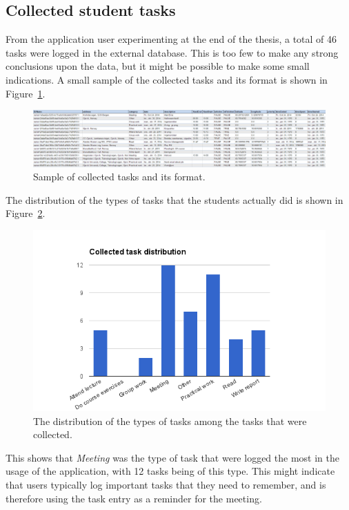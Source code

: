 \subsection{Collected student tasks}
\label{subsec:collectedtasks}

From the application user experimenting at the end of the thesis, a total of 46 tasks were logged in the external database. This is too few to make any strong conclusions upon the data, but it might be possible to make some small indications. A small sample of the collected tasks and its format is shown in Figure~\ref{fig:collectedtaskssample}.
\begin{figure}[tbp]
\centering
\includegraphics[width=\columnwidth]{figures/CollectedTasksFormat.PNG}
\caption[Collected tasks sample]{Sample of collected tasks and its format.}
\label{fig:collectedtaskssample}
\end{figure}

The distribution of the types of tasks that the students actually did is shown in Figure~\ref{fig:taskdistribution}.
\begin{figure}[tbp]
  \centering
  \includegraphics[width=\textwidth]{figures/TaskDistribution.png}
  \caption[Collected task type distribution]{The distribution of the types of tasks among the tasks that were collected.}
  \label{fig:taskdistribution}
\end{figure}
This shows that \emph{Meeting} was the type of task that were logged the most in the usage of the application, with 12 tasks being of this type. This might indicate that users typically log important tasks that they need to remember, and is therefore using the task entry as a reminder for the meeting.

